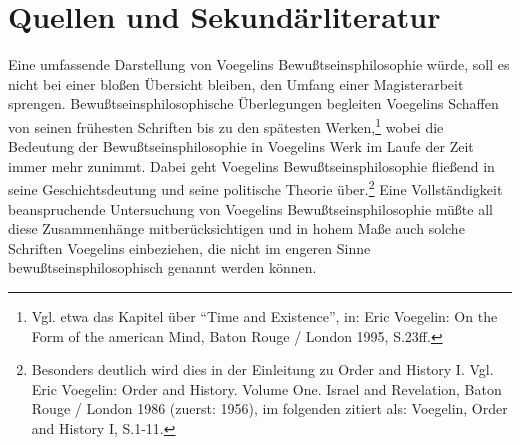  
\section{Quellen und Sekundärliteratur}

Eine umfassende Darstellung von Voegelins Bewußtseinsphilosophie würde,
soll es nicht bei einer bloßen Übersicht bleiben, den Umfang einer
Magisterarbeit sprengen. Bewußtseinsphilosophische Überlegungen
begleiten Voegelins Schaffen von seinen frühesten Schriften bis zu den
spätesten Werken,\footnote{Vgl. etwa das Kapitel über "`Time and
  Existence"', in: Eric Voegelin: On the Form of the american Mind,
  Baton Rouge / London 1995, S.23ff.} wobei die Bedeutung der
Bewußtseinsphilosophie in Voegelins Werk im Laufe der Zeit immer mehr
zunimmt.  Dabei geht Voegelins Bewußtseinsphilosophie fließend in seine
Geschichtsdeutung und seine politische Theorie über.\footnote{Besonders
  deutlich wird dies in der Einleitung zu Order and History I. Vgl. Eric
  Voegelin: Order and History. Volume One. Israel and Revelation, Baton
  Rouge / London 1986 (zuerst: 1956), im folgenden zitiert als:
  Voegelin, Order and History I, S.1-11.} Eine Vollständigkeit
beanspruchende Untersuchung von Voegelins Bewußtseinsphilosophie müßte
all diese Zusammenhänge mitberücksichtigen und in hohem Maße auch solche
Schriften Voegelins einbeziehen, die nicht im engeren Sinne
bewußtseinsphilosophisch genannt werden können.

